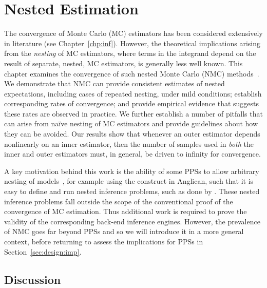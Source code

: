 
\chapter{Nested Estimation}
\label{chp:nest}

The convergence of Monte Carlo (MC) estimators has been considered extensively in 
literature (see Chapter~\ref{chp:inf}).  However, the theoretical implications
arising from the \emph{nesting} of MC estimators, where terms in the integrand depend on the
result of separate, nested, MC estimators, is generally less well known.
This chapter examines the convergence of such nested Monte Carlo (NMC) 
methods~\citep{rainforth2016pitfalls,rainforth2017pitfalls}.
We demonstrate that NMC can provide consistent estimates of 
nested expectations, including cases of repeated nesting, under mild conditions;
establish corresponding rates of convergence;
and provide empirical evidence that suggests these rates are observed in practice.
We further establish a number of pitfalls that can arise from na\"{i}ve nesting of MC estimators
and provide guidelines about how they can be avoided.
Our results show that whenever an outer estimator depends nonlinearly on an inner
estimator, then the number of samples used in \emph{both} the inner and outer estimators
must, in general, be driven to infinity for convergence.  

A key motivation behind this work is the ability of some PPSs to allow
arbitrary nesting of models~\cite{mantadelis2011nesting,stuhlmuller2014reasoning}, for example using
 the \conditional construct in Anglican,
such that it is easy to define and run nested inference problems, such as done
by \citep{ouyang2016practical,le2016nested}. These nested inference problems fall outside the
scope of the conventional proof of the convergence of MC estimation. Thus additional
work is required to prove the validity of the corresponding back-end inference engines.
However, the prevalence of NMC goes far beyond PPSs and so we will introduce it in
a more general context, before returning to assess the implications for PPSs in Section~\ref{sec:design:imp}.










\section{Discussion}
\label{sec:nest:disc}



